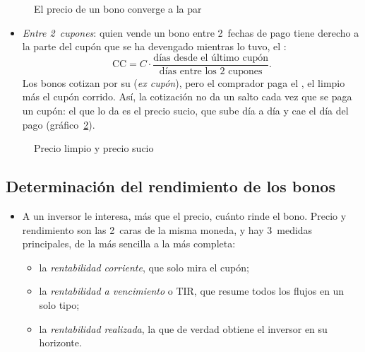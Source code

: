 \documentclass[11pt]{article}
\begin{document}
\begin{figure}[H]
\centering
\caption{El precio de un bono converge a la par}\label{fig:pull-to-par}
\end{figure}

\begin{itemize}
\item \emph{Entre 2~cupones}: quien vende un bono entre 2~fechas de pago tiene derecho a la parte del cupón que se ha devengado mientras lo tuvo, el :
  \[
  \mathrm{CC}=C\cdot\frac{\text{días desde el último cupón}}{\text{días entre los 2 cupones}} .
  \]
  Los bonos cotizan por su  (\emph{ex cupón}), pero el comprador paga el , el limpio más el cupón corrido\nocite{MarcoSanjuan2017PrecioCupon}. Así, la cotización no da un salto cada vez que se paga un cupón: el que lo da es el precio sucio, que sube día a día y cae el día del pago (gráfico~\ref{fig:precio-sucio}).
\end{itemize}

\begin{figure}[H]
\centering
\caption{Precio limpio y precio sucio}\label{fig:precio-sucio}
\end{figure}

\subsection{Determinación del rendimiento de los bonos}\label{sec:rendimiento}

\begin{itemize}
\item A un inversor le interesa, más que el precio, cuánto rinde el bono. Precio y rendimiento son las 2~caras de la misma moneda, y hay 3~medidas principales, de la más sencilla a la más completa:
  \begin{itemize}
  \item la \emph{rentabilidad corriente}, que solo mira el cupón;
  \item la \emph{rentabilidad a vencimiento} o TIR, que resume todos los flujos en un solo tipo;
  \item la \emph{rentabilidad realizada}, la que de verdad obtiene el inversor en su horizonte.
  \end{itemize}
\end{itemize}
\end{document}
